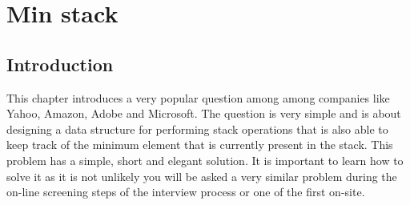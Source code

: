 %

\chapter{Min stack}
\label{ch:min_stack}
\section*{Introduction}
This chapter introduces a very popular question among among companies like Yahoo, Amazon, Adobe and Microsoft. The question is very simple and is about designing a data structure for performing stack operations that is also able to keep track of the minimum element that is currently present in the stack. This problem has a simple, short and elegant solution. It is important to learn how to solve it as it is not unlikely you will be asked a very similar problem during the on-line screening steps of the interview process or one of the first on-site.

